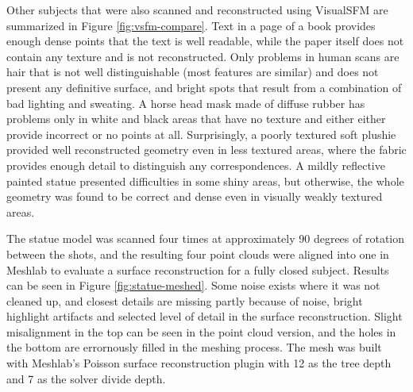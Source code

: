 %
Other subjects that were also scanned and reconstructed using VisualSFM are summarized in Figure \ref{fig:vsfm-compare}.
Text in a page of a book provides enough dense points that the text is well readable, while the paper itself does not contain any texture and is not reconstructed.
Only problems in human scans are hair that is not well distinguishable (most features are similar) and does not present any definitive surface, and bright spots that result from a combination of bad lighting and sweating.
A horse head mask made of diffuse rubber has problems only in white and black areas that have no texture and either either provide incorrect or no points at all.
Surprisingly, a poorly textured soft plushie provided well reconstructed geometry even in less textured areas, where the fabric provides enough detail to distinguish any correspondences.
A mildly reflective painted statue presented difficulties in some shiny areas, but otherwise, the whole geometry was found to be correct and dense even in visually weakly textured areas.


The statue model was scanned four times at approximately 90 degrees of rotation between the shots, and the resulting four point clouds were aligned into one in Meshlab to evaluate a surface reconstruction for a fully closed subject.
Results can be seen in Figure \ref{fig:statue-meshed}.
Some noise exists where it was not cleaned up, and closest details are missing partly because of noise, bright highlight artifacts and selected level of detail in the surface reconstruction.
Slight misalignment in the top can be seen in the point cloud version, and the holes in the bottom are errornously filled in the meshing process.
The mesh was built with Meshlab's Poisson surface reconstruction plugin with 12 as the tree depth and  7 as the solver divide depth.

